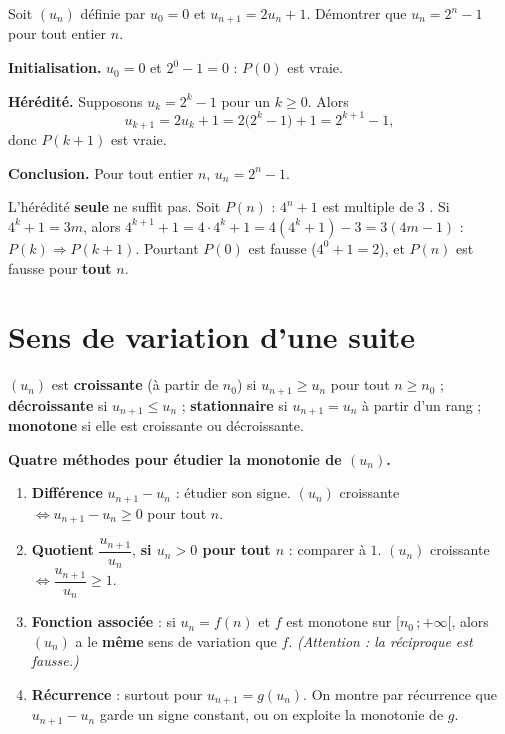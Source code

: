 \exerciceresolu
Soit $(u_n)$ définie par $u_0=0$ et $u_{n+1}=2u_n+1$.
Démontrer que $u_n=2^{n}-1$ pour tout entier $n$.

\solution

\textbf{Initialisation.} $u_0=0$ et $2^{0}-1=0$ : $P(0)$ est vraie.

\textbf{Hérédité.} Supposons $u_k=2^{k}-1$ pour un $k\geq 0$. Alors
\[
u_{k+1}=2u_k+1=2\bigl(2^{k}-1\bigr)+1=2^{k+1}-1,
\]
donc $P(k+1)$ est vraie.

\textbf{Conclusion.} Pour tout entier $n$, $u_n=2^{n}-1$.

\begin{attention}
	L'hérédité \textbf{seule} ne suffit pas. Soit $P(n)$ : \og $4^{n}+1$ est
	multiple de $3$ \fg. Si $4^{k}+1=3m$, alors
	$4^{k+1}+1=4\cdot 4^{k}+1=4(4^{k}+1)-3=3(4m-1)$ : $P(k)\Rightarrow P(k+1)$.
	Pourtant $P(0)$ est fausse ($4^{0}+1=2$), et $P(n)$ est fausse pour
	\textbf{tout} $n$.
\end{attention}


\section{Sens de variation d'une suite}

\begin{definition}
	$(u_n)$ est \textbf{croissante} (à partir de $n_0$) si $u_{n+1}\geq u_n$
	pour tout $n\geq n_0$ ; \textbf{décroissante} si $u_{n+1}\leq u_n$ ;
	\textbf{stationnaire} si $u_{n+1}=u_n$ à partir d'un rang ;
	\textbf{monotone} si elle est croissante ou décroissante.
\end{definition}

\begin{methode}
	\textbf{Quatre méthodes pour étudier la monotonie de $(u_n)$.}
	\begin{enumerate}
		\item \textbf{Différence} $u_{n+1}-u_n$ : étudier son signe.
		$(u_n)$ croissante $\iff u_{n+1}-u_n\geq 0$ pour tout $n$.
		\item \textbf{Quotient} $\dfrac{u_{n+1}}{u_n}$, \textbf{si $u_n>0$ pour
		tout $n$} : comparer à $1$.
		$(u_n)$ croissante $\iff \dfrac{u_{n+1}}{u_n}\geq 1$.
		\item \textbf{Fonction associée} : si $u_n=f(n)$ et $f$ est monotone sur
		$[n_0\,;+\infty[$, alors $(u_n)$ a le \textbf{même} sens de variation
		que $f$. \emph{(Attention : la réciproque est fausse.)}
		\item \textbf{Récurrence} : surtout pour $u_{n+1}=g(u_n)$. On montre par
		récurrence que $u_{n+1}-u_n$ garde un signe constant, ou on exploite la
		monotonie de $g$.
	\end{enumerate}
\end{methode}

